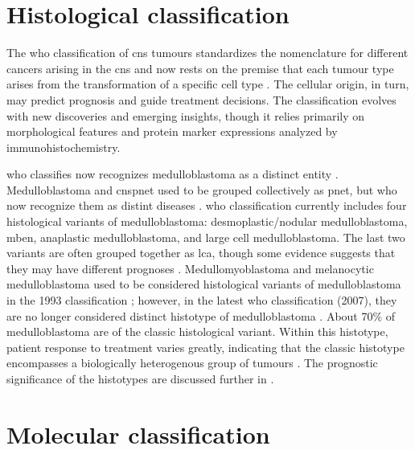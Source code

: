 \section{Histological classification}

The \gls{who} classification of \gls{cns} tumours standardizes the nomenclature for different cancers arising in the \gls{cns} and now rests on the premise that each tumour type arises from the transformation of a specific cell type . The cellular origin, in turn, may predict prognosis and guide treatment decisions. The classification evolves with new discoveries and emerging insights, though it relies primarily on morphological features and protein marker expressions analyzed by immunohistochemistry.

\gls{who} classifies now recognizes medulloblastoma as a distinct entity . Medulloblastoma and \gls{cnspnet} used to be grouped collectively as \gls{pnet}, but \gls{who} now recognize them as distint diseases . \gls{who} classification currently includes four histological variants of medulloblastoma: desmoplastic/nodular medulloblastoma, \gls{mben}, anaplastic medulloblastoma, and large cell medulloblastoma. The last two variants are often grouped together as \gls{lca}, though some evidence suggests that they may have different prognoses . Medullomyoblastoma and melanocytic medulloblastoma used to be considered histological variants of medulloblastoma in the 1993 classification ; however, in the latest \gls{who} classification (2007), they are no longer considered distinct histotype of medulloblastoma . About 70\% of medulloblastoma are of the classic histological variant. Within this histotype, patient response to treatment varies greatly, indicating that the classic histotype encompasses a biologically heterogenous group of tumours . The prognostic significance of the histotypes are discussed further in .



\section{Molecular classification}

